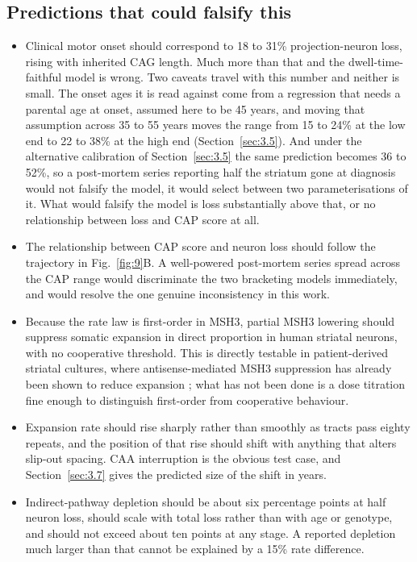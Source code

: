 \documentclass[conference]{IEEEtran}
\begin{document}
\subsection{Predictions that could falsify this}
\label{sec:4.3}
\begin{itemize}
\item Clinical motor onset should correspond to 18 to 31\% projection-neuron loss, rising with inherited CAG length. Much more than that and the dwell-time-faithful model is wrong. Two caveats travel with this number and neither is small. The onset ages it is read against come from a regression that needs a parental age at onset, assumed here to be 45 years, and moving that assumption across 35 to 55 years moves the range from 15 to 24\% at the low end to 22 to 38\% at the high end (Section~\ref{sec:3.5}). And under the alternative calibration of Section~\ref{sec:3.5} the same prediction becomes 36 to 52\%, so a post-mortem series reporting half the striatum gone at diagnosis would not falsify the model, it would select between two parameterisations of it. What would falsify the model is loss substantially above that, or no relationship between loss and CAP score at all.
\item The relationship between CAP score and neuron loss should follow the trajectory in Fig.~\ref{fig:9}B. A well-powered post-mortem series spread across the CAP range would discriminate the two bracketing models immediately, and would resolve the one genuine inconsistency in this work.
\item Because the rate law is first-order in MSH3, partial MSH3 lowering should suppress somatic expansion in direct proportion in human striatal neurons, with no cooperative threshold. This is directly testable in patient-derived striatal cultures, where antisense-mediated MSH3 suppression has already been shown to reduce expansion \cite{aso}; what has not been done is a dose titration fine enough to distinguish first-order from cooperative behaviour.
\item Expansion rate should rise sharply rather than smoothly as tracts pass eighty repeats, and the position of that rise should shift with anything that alters slip-out spacing. CAA interruption is the obvious test case, and Section~\ref{sec:3.7} gives the predicted size of the shift in years.
\item Indirect-pathway depletion should be about six percentage points at half neuron loss, should scale with total loss rather than with age or genotype, and should not exceed about ten points at any stage. A reported depletion much larger than that cannot be explained by a 15\% rate difference.
\end{itemize}
\end{document}

